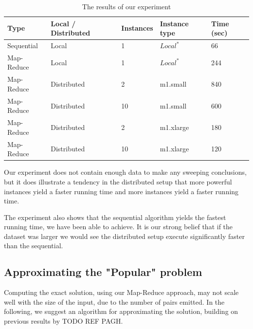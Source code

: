 \documentclass[a4paper,11pt]{article}
\begin{document}
\begin{table}[h!]

\begin{center}
    \begin{tabular}{|l|l|l|l|l|}
    \hline
    Type       & Local / Distributed & Instances & Instance type                     & Time (sec) \\ \hline
    Sequential & Local               & 1         & $Local^*$ & 66                 \\ \hline
    Map-Reduce & Local               & 1         & $Local^*$ & 244                 \\ \hline
    Map-Reduce & Distributed         & 2         & m1.small                          & 840                 \\ \hline
    Map-Reduce & Distributed         & 10        & m1.small                          & 600                 \\ \hline
    Map-Reduce & Distributed         & 2         & m1.xlarge                         & 180                 \\ \hline
    Map-Reduce & Distributed         & 10        & m1.xlarge                         & 120                 \\ \hline
    \end{tabular}
    \end{center}
    \caption{The results of our experiment}\label{tab:benchmark}
\end{table}
Our experiment does not contain enough data to make any sweeping conclusions, but it does illustrate a tendency in the distributed setup that more powerful instances yield a faster running time and more instances yield a faster running time. 

The experiment also shows that the sequential algorithm yields the fastest running time, we have been able to achieve. 
It is our strong belief that if the dataset was larger we would see the distributed setup execute significantly faster than the sequential.

\subsection{Approximating the "Popular" problem}
Computing the exact solution, using our Map-Reduce approach, may not scale well with the size of the input, due to the number of pairs emitted. In the following, we suggest an algorithm for approximating the solution, building on previous results by TODO REF PAGH.
\end{document}
